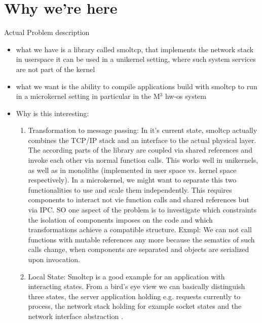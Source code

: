 \section{Why we're here}

Actual Problem description
\begin{itemize}
    \item what we have is a library called smoltcp, that implements the network stack in userspace \means it can be used in a unikernel setting, where such system services are not part of the kernel
    \item what we want is the ability to compile applications build with smoltcp to run in a microkernel setting in particular in the M$^3$ hw-os system
    \item Why is this interesting:
    \begin{enumerate}
        \item Transformation to message passing: In it's current state, smoltcp actually combines the TCP/IP stack and an interface to the actual physical layer. The according parts of the library are coupled via shared references and invoke each other via normal function calls. This works well in unikernels, as well as in monoliths (implemented in user space vs. kernel space respectively). In a microkernel, we might want to separate this two functionalities to use and scale them independently. This requires components to interact not vie function calls and shared references but via IPC. SO one aspect of the problem is to investigate which constraints the isolation of components imposes on the code and which transformations achieve a compatible structure. Exmpl: We can not call functions with mutable references any more because the sematics of such calls change, when components are separated and objects are serialized upon invocation.
        \item Local State: Smoltcp is a good example for an application with interacting states. From a bird's eye view we can basically distinguish three states, the server application holding e.g. requests currently to process, the network stack holding for example socket states and the network interface abstraction . 
        

\end{enumerate}
\end{itemize}
